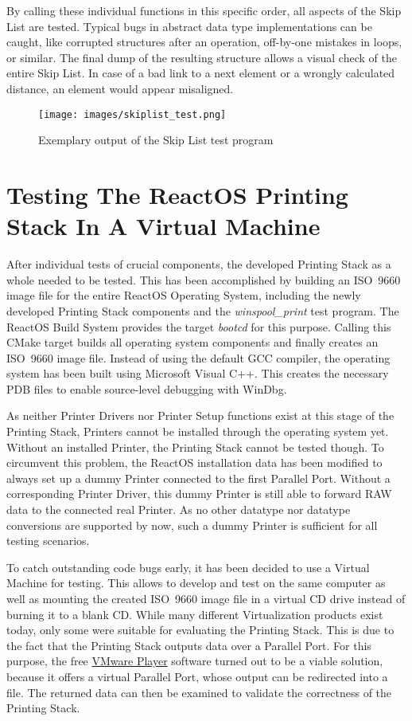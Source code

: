 By calling these individual functions in this specific order, all aspects of the Skip List are tested.
Typical bugs in abstract data type implementations can be caught, like corrupted structures after an operation, off-by-one mistakes in loops, or similar.
The final dump of the resulting structure allows a visual check of the entire Skip List.
In case of a bad link to a next element or a wrongly calculated distance, an element would appear misaligned.

\begin{figure}[b]
	\centering
	\texttt{[image: images/skiplist\_test.png]}
	\caption{Exemplary output of the Skip List test program}
	\label{fig:skiplist_test}
\end{figure}


\section{Testing The ReactOS Printing Stack In A Virtual Machine}
After individual tests of crucial components, the developed Printing Stack as a whole needed to be tested.
This has been accomplished by building an ISO~9660 image file for the entire ReactOS Operating System, including the newly developed Printing Stack components and the \emph{winspool\_print} test program.
The ReactOS Build System provides the target \emph{bootcd} for this purpose.
Calling this CMake target builds all operating system components and finally creates an ISO~9660 image file.
Instead of using the default GCC compiler, the operating system has been built using Microsoft Visual C++.
This creates the necessary \gls{PDB} files to enable source-level debugging with WinDbg.

As neither Printer Drivers nor Printer Setup functions exist at this stage of the Printing Stack, Printers cannot be installed through the operating system yet.
Without an installed Printer, the Printing Stack cannot be tested though.
To circumvent this problem, the ReactOS installation data has been modified to always set up a dummy Printer connected to the first Parallel Port.
Without a corresponding Printer Driver, this dummy Printer is still able to forward RAW data to the connected real Printer.
As no other datatype nor datatype conversions are supported by now, such a dummy Printer is sufficient for all testing scenarios.

To catch outstanding code bugs early, it has been decided to use a Virtual Machine for testing.
This allows to develop and test on the same computer as well as mounting the created ISO~9660 image file in a virtual CD drive instead of burning it to a blank CD.
While many different Virtualization products exist today, only some were suitable for evaluating the Printing Stack.
This is due to the fact that the Printing Stack outputs data over a Parallel Port.
For this purpose, the free \href{http://www.vmware.com/products/player}{VMware Player} software turned out to be a viable solution, because it offers a virtual Parallel Port, whose output can be redirected into a file.
The returned data can then be examined to validate the correctness of the Printing Stack.

